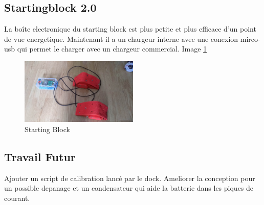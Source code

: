 \documentclass[12pt]{article}
\begin{document}


\subsection{Startingblock 2.0}
\begin{par}
	La boîte electronique du starting block est plus 
	petite et plus efficace d'un point de vue energetique.
	Maintenant il a un chargeur interne avec une conexion
	mirco-usb qui permet le charger avec un chargeur
	commercial. Image \ref{img:sb:complete}
\end{par}

\begin{figure}[!htb]
	\centering
	\includegraphics[width=0.5\textwidth]{img/StartingBlockCompleto.jpg}
	\caption{Starting Block}
	\label{img:sb:complete}
\end{figure}

\subsection*{Travail Futur}
\begin{par}
	Ajouter un script de calibration lanc\'e par le dock. 
	Ameliorer la conception pour un possible depanage et
	un condensateur qui aide
	la batterie dans les piques de courant.
\end{par}
\end{document}
